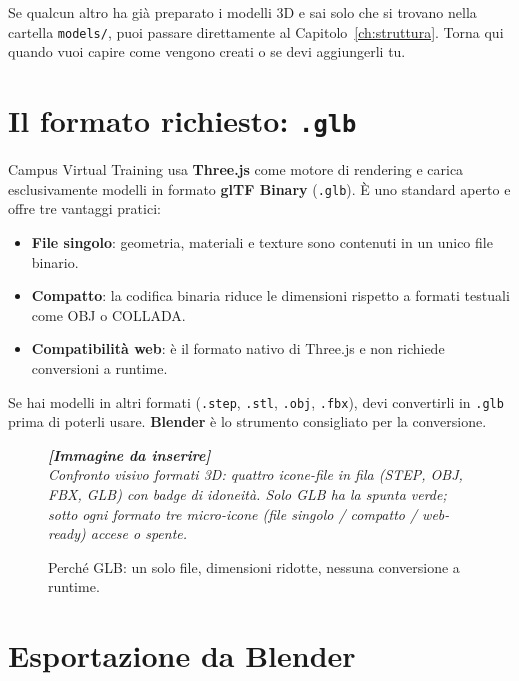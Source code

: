 ﻿\documentclass[a4paper,12pt,oneside]{book}
\newcommand{\file}[1]{\texttt{#1}}
\newcommand{\imgph}[2]{%
  \begin{tcolorbox}[colback=cvtlightblue!30,colframe=cvtblue!40,%
    width=#1,halign=center,valign=center,height=5cm,boxrule=0.5pt,arc=3pt]%
    \textcolor{cvtgray}{\itshape\footnotesize\textbf{[Immagine da inserire]}\\[3pt]#2}%
  \end{tcolorbox}}
\begin{document}
\begin{notablu}
Se qualcun altro ha già preparato i modelli 3D e sai solo che si trovano
nella cartella \file{models/}, puoi passare direttamente al
Capitolo~\ref{ch:struttura}. Torna qui quando vuoi capire come vengono
creati o se devi aggiungerli tu.
\end{notablu}

\section{Il formato richiesto: \texttt{.glb}}

Campus Virtual Training usa \textbf{Three.js} come motore di rendering
e carica esclusivamente modelli in formato \textbf{glTF Binary}
(\file{.glb}). È uno standard aperto e offre tre vantaggi pratici:

\begin{itemize}
  \item \textbf{File singolo}: geometria, materiali e texture sono
        contenuti in un unico file binario.
  \item \textbf{Compatto}: la codifica binaria riduce le dimensioni
        rispetto a formati testuali come OBJ o COLLADA.
  \item \textbf{Compatibilità web}: è il formato nativo di Three.js e
        non richiede conversioni a runtime.
\end{itemize}

\begin{notablu}[Ricorda]
Se hai modelli in altri formati (\file{.step}, \file{.stl}, \file{.obj},
\file{.fbx}), devi convertirli in \file{.glb} prima di poterli usare.
\textbf{Blender} è lo strumento consigliato per la conversione.
\end{notablu}

\begin{figure}[H]
  \centering
  \imgph{12cm}{Confronto visivo formati 3D: quattro icone-file in fila (STEP, OBJ, FBX, GLB) con badge di idoneità. Solo GLB ha la spunta verde; sotto ogni formato tre micro-icone (file singolo / compatto / web-ready) accese o spente.}
  \caption{Perché GLB: un solo file, dimensioni ridotte, nessuna conversione a runtime.}
  \label{fig:formati-confronto}
\end{figure}

\section{Esportazione da Blender}
\end{document}
